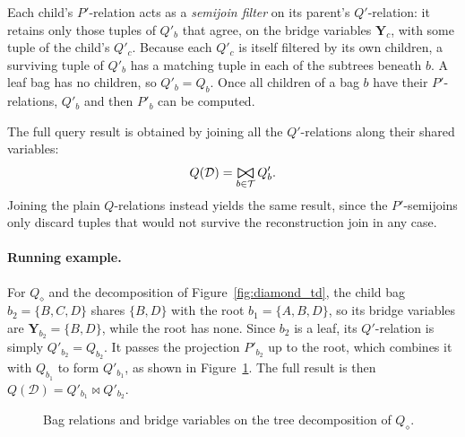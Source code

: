 Each child's $P'$-relation acts as a \emph{semijoin filter} on its parent's $Q'$-relation: it retains only those tuples of $Q'_b$ that agree, on the bridge variables $\mathbf{Y}_c$, with some tuple of the child's $Q'_c$.
Because each $Q'_c$ is itself filtered by its own children, a surviving tuple of $Q'_b$ has a matching tuple in each of the subtrees beneath $b$.
A leaf bag has no children, so $Q'_b = Q_b$. Once all children of a bag $b$ have their $P'$-relations, $Q'_b$ and then $P'_b$ can be computed.

\medskip

The full query result is obtained by joining all the $Q'$-relations along their shared variables:
\[
    Q(\mathcal{D}) = \bigbowtie_{b \in \mathcal{T}} Q'_b.
\]
Joining the plain $Q$-relations instead yields the same result, since the $P'$-semijoins only discard tuples that would not survive the reconstruction join in any case.

\paragraph{Running example.}
For $Q_\diamond$ and the decomposition of Figure~\ref{fig:diamond_td}, the child bag $b_2 = \{B,C,D\}$ shares $\{B,D\}$ with the root $b_1 = \{A,B,D\}$, so its bridge variables are $\mathbf{Y}_{b_2} = \{B,D\}$, while the root has none.
Since $b_2$ is a leaf, its $Q'$-relation is simply $Q'_{b_2} = Q_{b_2}$. It passes the projection $P'_{b_2}$ up to the root, which combines it with $Q_{b_1}$ to form $Q'_{b_1}$, as shown in Figure~\ref{fig:diamond_ivm}.
The full result is then $Q(\mathcal{D}) = Q'_{b_1} \bowtie Q'_{b_2}$.

\begin{figure}[H]
  \centering
  \caption{Bag relations and bridge variables on the tree decomposition of $Q_\diamond$.}
  \label{fig:diamond_ivm}
\end{figure}

